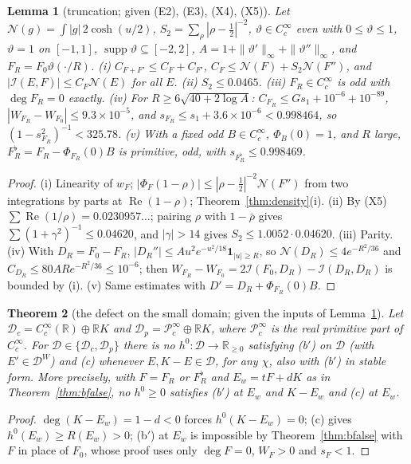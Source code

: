 \documentclass[11pt]{amsart}
\newtheorem{theorem}{Theorem}[section]
\newtheorem{lemma}[theorem]{Lemma}
\theoremstyle{definition}
\theoremstyle{remark}
\newcommand{\R}{\mathbb R}
\newcommand{\Rel}{\operatorname{Re}}
\newcommand{\supp}{\operatorname{supp}}
\newcommand{\DW}{\mathcal D^{W}}
\newcommand{\I}{\mathcal I}
\newcommand{\dg}{\deg}
\begin{document}
\begin{lemma}[truncation; given (E2), (E3), (X4), (X5)]\label{lem:trunc}
Let $\mathcal N(g)=\int|g|\,2\cosh(u/2)$, $S_2=\sum_\rho|\rho-\frac12|^{-2}$, $\vartheta\in C_c^\infty$ even with
$0\le\vartheta\le1$, $\vartheta=1$ on $[-1,1]$, $\supp\vartheta\subseteq[-2,2]$, $A=1+\|\vartheta'\|_\infty+\|\vartheta''\|_\infty$, and
$F_R=F_0\vartheta(\cdot/R)$.
(i) $C_{F+F'}\le C_F+C_{F'}$, $C_F\le\mathcal N(F)+S_2\mathcal N(F'')$, and $|\I(E,F)|\le C_F\mathcal N(E)$ for all $E$.
(ii) $S_2\le0.0465$.
(iii) $F_R\in C_c^\infty$ is odd with $\dg F_R=0$ exactly.
(iv) For $R\ge6\sqrt{40+2\log A}$: $C_{F_R}\le Gs_1+10^{-6}+10^{-89}$, $|W_{F_R}-W_{F_0}|\le9.3\times10^{-5}$,
and $s_{F_R}\le s_1+3.6\times10^{-6}<0.998464$, so $(1-s_{F_R}^2)^{-1}<325.78$.
(v) With a fixed odd $B\in C_c^\infty$, $\Phi_B(0)=1$, and $R$ large, $F_R^\flat=F_R-\Phi_{F_R}(0)B$ is primitive,
odd, with $s_{F_R^\flat}\le0.998469$.
\end{lemma}
\begin{proof}
(i) Linearity of $w_F$; $|\Phi_F(1-\rho)|\le|\rho-\frac12|^{-2}\mathcal N(F'')$ from two integrations by parts at
$\Rel(1-\rho)$; Theorem~\ref{thm:density}(i). (ii) By (X5) $\sum\Rel(1/\rho)=0.0230957\ldots$; pairing $\rho$
with $1-\bar\rho$ gives $\sum(1+\gamma^2)^{-1}\le0.04620$, and $|\gamma|>14$ gives $S_2\le1.0052\cdot0.04620$.
(iii) Parity. (iv) With $D_R=F_0-F_R$, $|D_R''|\le Au^2e^{-u^2/18}\mathbf 1_{|u|\ge R}$, so
$\mathcal N(D_R)\le4e^{-R^2/36}$ and $C_{D_R}\le80ARe^{-R^2/36}\le10^{-6}$; then
$W_{F_R}-W_{F_0}=2\I(F_0,D_R)-\I(D_R,D_R)$ is bounded by (i). (v) Same estimates with $D'=D_R+\Phi_{F_R}(0)B$.
\end{proof}

\begin{theorem}[the defect on the small domain; given the inputs of Lemma~\ref{lem:trunc}]\label{cor:smalldomain}
Let $\mathcal D_c=C_c^\infty(\R)\oplus\R K$ and $\mathcal D_p=\mathcal P^\infty_c\oplus\R K$, where $\mathcal P^\infty_c$ is the
real primitive part of $C_c^\infty$. For $\mathcal D\in\{\mathcal D_c,\mathcal D_p\}$ there is no $h^0:\mathcal D\to\R_{\ge0}$
satisfying (b$'$) on $\mathcal D$ (with $E'\in\DW$) and (c) whenever $E,K-E\in\mathcal D$, for any $\chi$, also with
(b$'$) in stable form. More precisely, with $F=F_R$ or $F_R^\flat$ and $E_w=tF+dK$ as in
Theorem~\ref{thm:bfalse}, no $h^0\ge0$ satisfies (b$'$) at $E_w$ and $K-E_w$ and (c) at $E_w$.
\end{theorem}
\begin{proof}
$\dg(K-E_w)=1-d<0$ forces $h^0(K-E_w)=0$; (c) gives $h^0(E_w)\ge R(E_w)>0$; (b$'$) at $E_w$ is impossible
by Theorem~\ref{thm:bfalse} with $F$ in place of $F_0$, whose proof uses only $\dg F=0$, $W_F>0$ and $s_F<1$.
\end{proof}
\end{document}
